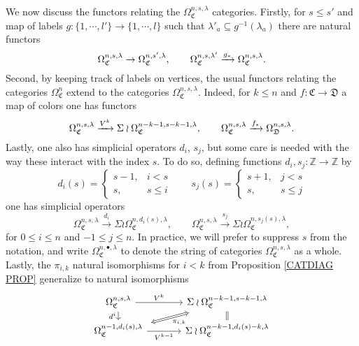 \documentclass[a4paper,10pt
,draft
]{article}%
\renewcommand{\1}{\eta}%
\begin{document}
We now discuss the functors relating the $\Omega_{\mathfrak{C}}^{n,s,\lambda}$ categories. Firstly, for 
$s \leq s'$ 
and map of labels $g \colon \{1,\cdots,l'\} \to \{1,\cdots,l\}$
such that $\lambda'_a \subseteq g^{-1}\left( \lambda_a\right)$
there are natural functors
\[
\Omega_{\mathfrak{C}}^{n,s,\lambda} \to \Omega_{\mathfrak{C}}^{n,s',\lambda},
\qquad
\Omega_{\mathfrak{C}}^{n,s,\lambda'} \xrightarrow{g_{\**}} \Omega_{\mathfrak{C}}^{n,s,\lambda}.
\]
Second, by keeping track of labels on vertices,
 the usual functors relating the categories 
$\Omega^n_{\mathfrak{C}}$ extend to the categories
$\Omega_{\mathfrak{C}}^{n,s,\lambda}$. Indeed, for 
$k \leq n$
and 
$f \colon \mathfrak{C} \to \mathfrak{D}$ a map of colors
one has functors
\begin{equation}\label{FGTLABEL EQ}
\Omega_{\mathfrak{C}}^{n,s,\lambda} \xrightarrow{V^k} \Sigma \wr\Omega_{\mathfrak{C}}^{n-k-1,s-k-1,\lambda},
\qquad
\Omega_{\mathfrak{C}}^{n,s,\lambda} \xrightarrow{f_{\**}} \Omega_{\mathfrak{D}}^{n,s,\lambda}.
\end{equation}
Lastly, one also has simplicial operators $d_i$, $s_j$, 
but some care is needed with the way these interact with the index $s$. To do so, defining functions $d_i,s_j\colon \mathbb{Z} \to \mathbb{Z}$ by
\begin{equation}\label{SIMPLEXP EQ}
 d_i(s) = 
\begin{cases}
s-1, & i<s
\\
s, & s\leq i
\end{cases}
\qquad
s_j(s) = 
\begin{cases}
s+1, & j<s
\\
s, & s\leq j
\end{cases}
\end{equation}
one has simplicial operators
\[
\Omega_{\mathfrak{C}}^{n,s,\lambda} \xrightarrow{d_i} \Sigma \wr\Omega_{\mathfrak{C}}^{n,d_i(s),\lambda},
\qquad
\Omega_{\mathfrak{C}}^{n,s,\lambda} \xrightarrow{s_j} \Sigma \wr\Omega_{\mathfrak{C}}^{n,s_j(s),\lambda},
\]
for $0\leq i \leq n$ and $-1\leq j \leq n$.
In practice, we will prefer to suppress $s$ from the notation,
and write 
$\Omega_{\mathfrak{C}}^{n,\bullet,\lambda}$ to denote the string of categories 
$\Omega_{\mathfrak{C}}^{n,s,\lambda}$ as a whole.
Lastly, the $\pi_{i,k}$ natural isomorphisms for $i<k$ from Proposition \ref{CATDIAG PROP}
generalize to natural isomorphisms
\begin{equation}
\begin{tikzcd}[row sep = tiny, column sep = 35pt]
	\Omega_{\mathfrak{C}}^{n,s,\lambda}
	\arrow{r}{V^k} \arrow{dd}[swap]{d^i} &
	|[alias=U]|
	 \Sigma \wr \Omega_{\mathfrak{C}}^{n-k-1,s-k-1,\lambda}
	 \ar[equal]{dd}{}
\\
\\
	|[alias=V]|
	\Omega_{\mathfrak{C}}^{n-1,d_i(s),\lambda} \arrow{r}[swap]{V^{k-1}} &
	 \Sigma \wr \Omega_{\mathfrak{C}}^{n-k-1,d_i(s)-k,\lambda}
\arrow[Leftrightarrow, from=V, to=U,shorten >=0.15cm,shorten <=0.15cm
,swap,"\pi_{i,k}"
]
\end{tikzcd}
\end{equation}
\end{document}
